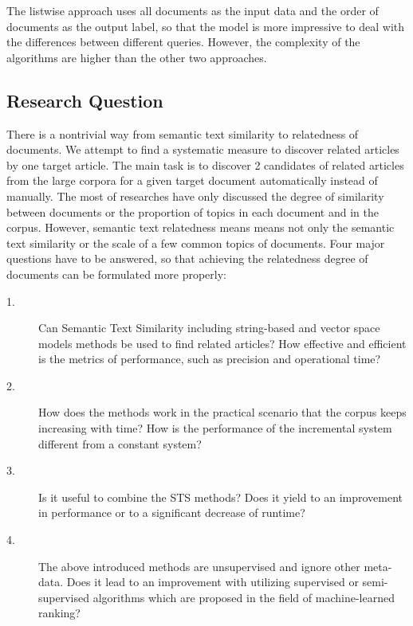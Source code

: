 The listwise approach uses all documents as the input data and the order of documents as the output label, so that the model is more impressive to deal with the differences between different queries. However, the complexity of the algorithms are higher than the other two approaches. 


\subsection{Research Question}
\label{sec:2.5}

There is a nontrivial way from semantic text similarity to relatedness of documents. We attempt to find a systematic measure to discover related articles by one target article. The main task is to discover 2 candidates of related articles from the large corpora for a given target document automatically instead of manually. The most of researches have only discussed the degree of similarity between documents or the proportion of topics in each document and in the corpus. However, semantic text relatedness means means not only the semantic text similarity or the scale of a few common topics of documents. Four major questions have to be answered, so that achieving the relatedness degree of documents can be formulated more properly: 

\begin{description}
    \item[1.] \label{q:1} Can Semantic Text Similarity including string-based and vector space models methods be used to find related articles? How effective and efficient is the metrics of performance, such as precision and operational time?
    \item[2.] \label{q:2} How does the methods work in the practical scenario that the corpus keeps increasing with time? How is the performance of the incremental system different from a constant system? 
    \item[3.] \label{q:3} Is it useful to combine the STS methods? Does it yield to an improvement in performance or to a significant decrease of runtime?
    \item[4.] \label{q:4} The above introduced methods are unsupervised and ignore other meta-data. Does it lead to an improvement with utilizing supervised or semi-supervised algorithms which are proposed in the field of machine-learned ranking?
\end{description}